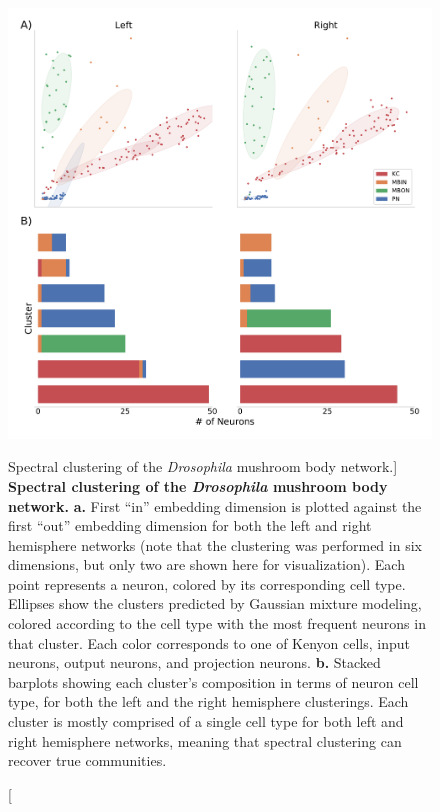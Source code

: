 \begin{figure}
    \centering
    \includegraphics[width = .8\linewidth]{figures/dnd/mb-clustering.pdf}
    \caption
    [Spectral clustering of the \textit{Drosophila} mushroom body network.]
    {\textbf{Spectral clustering of the \textit{Drosophila} mushroom body network.} \textbf{a.} First ``in'' embedding dimension is plotted against the first ``out'' embedding dimension for both the left and right hemisphere networks (note that the clustering was performed in six dimensions, but only two are shown here for visualization). Each point represents a neuron, colored by its corresponding cell type. Ellipses show the clusters predicted by Gaussian mixture modeling, colored according to the cell type with the most frequent neurons in that cluster. Each color corresponds to one of Kenyon cells, input neurons, output neurons, and projection neurons. \textbf{b.} Stacked barplots showing each cluster's composition in terms of neuron cell type, for both the left and the right hemisphere clusterings. Each cluster is mostly comprised of a single cell type for both left and right hemisphere networks, meaning that spectral clustering can recover true communities. }
    \label{fig:mb-clustering}
\end{figure}

